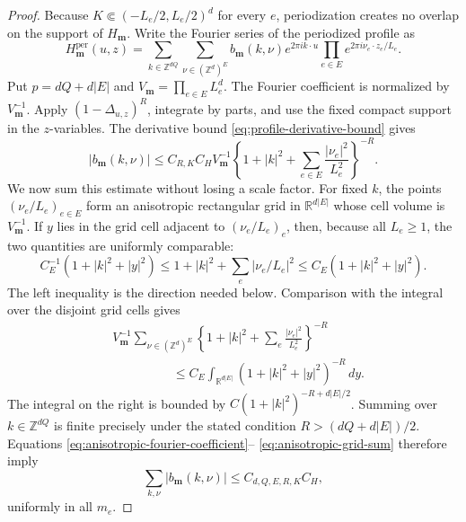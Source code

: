 \documentclass[11pt]{article}
\newcommand{\R}{\mathbb{R}}
\newcommand{\abs}[1]{\lvert #1\rvert}
\begin{document}
\begin{proof}
Because \(K\Subset(-L_e/2,L_e/2)^d\) for every \(e\), periodization creates
no overlap on the support of \(H_{\bm m}\).  Write the Fourier series of the
periodized profile as
\begin{equation}
 H_{\bm m}^{\mathrm{per}}(u,z)
 =\sum_{k\in\mathbb Z^{dQ}}
   \sum_{\nu\in(\mathbb Z^d)^E}
   b_{\bm m}(k,\nu)
   e^{2\pi i k\cdot u}
   \prod_{e\in E}e^{2\pi i\nu_e\cdot z_e/L_e}.
 \label{eq:profile-fourier-series}
\end{equation}
Put \(p=dQ+d\abs E\) and
\(V_{\bm m}=\prod_{e\in E}L_e^d\).  The Fourier coefficient is normalized by
\(V_{\bm m}^{-1}\).  Apply \((1-\Delta_{u,z})^R\), integrate by parts, and
use the fixed compact support in the \(z\)-variables.  The derivative bound
\eqref{eq:profile-derivative-bound} gives
\begin{equation}
 \abs{b_{\bm m}(k,\nu)}
 \le C_{R,K}C_H V_{\bm m}^{-1}
 \left\{1+\abs k^2+
  \sum_{e\in E}\frac{\abs{\nu_e}^2}{L_e^2}\right\}^{-R}.
 \label{eq:anisotropic-fourier-coefficient}
\end{equation}
We now sum this estimate without losing a scale factor.  For fixed \(k\),
the points \((\nu_e/L_e)_{e\in E}\) form an anisotropic rectangular grid in
\(\R^{d\abs E}\) whose cell volume is \(V_{\bm m}^{-1}\).  If
\(y\) lies in the grid cell adjacent to \((\nu_e/L_e)_e\), then, because
all \(L_e\ge1\), the two quantities are uniformly comparable:
\[
 C_E^{-1}\left(1+\abs k^2+\abs y^2\right)
 \le 1+\abs k^2+\sum_e\abs{\nu_e/L_e}^2
 \le C_E\left(1+\abs k^2+\abs y^2\right).
\]
The left inequality is the direction needed below.  Comparison with the
integral over the disjoint grid cells gives
\begin{align}
 &V_{\bm m}^{-1}
 \sum_{\nu\in(\mathbb Z^d)^E}
 \left\{1+\abs k^2+
  \sum_e\frac{\abs{\nu_e}^2}{L_e^2}\right\}^{-R}
 \nonumber\\
 &\hspace{2cm}\le
 C_E\int_{\R^{d\abs E}}
       (1+\abs k^2+\abs y^2)^{-R}\,dy.
 \label{eq:anisotropic-grid-sum}
\end{align}
The integral on the right is bounded by
\(C(1+\abs k^2)^{-R+d\abs E/2}\).  Summing over
\(k\in\mathbb Z^{dQ}\) is finite precisely under the stated condition
\(R>(dQ+d\abs E)/2\).  Equations
\eqref{eq:anisotropic-fourier-coefficient}--
\eqref{eq:anisotropic-grid-sum} therefore imply
\begin{equation}
 \sum_{k,\nu}\abs{b_{\bm m}(k,\nu)}
 \le C_{d,Q,E,R,K}C_H,
 \label{eq:profile-l1-fourier}
\end{equation}
uniformly in all \(m_e\).


\end{proof}
\end{document}
